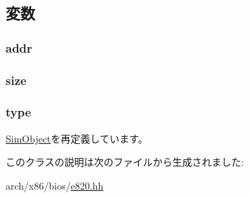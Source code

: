 \subsection{変数}
\hypertarget{classX86ISA_1_1E820Entry_a0bb77b4ba61e408313e1118250f9278c}{
\subsubsection[{addr}]{ {\bf addr}}}
\label{classX86ISA_1_1E820Entry_a0bb77b4ba61e408313e1118250f9278c}
\hypertarget{classX86ISA_1_1E820Entry_a8ce507144b5ef53350af753eafb669f0}{
\subsubsection[{size}]{ {\bf size}}}
\label{classX86ISA_1_1E820Entry_a8ce507144b5ef53350af753eafb669f0}
\hypertarget{classX86ISA_1_1E820Entry_ad44b615021ed3ccb734fcaf583ef4a03}{
\subsubsection[{type}]{ {\bf type}}}
\label{classX86ISA_1_1E820Entry_ad44b615021ed3ccb734fcaf583ef4a03}


\hyperlink{classm5_1_1SimObject_1_1SimObject_acce15679d830831b0bbe8ebc2a60b2ca}{SimObject}を再定義しています。

このクラスの説明は次のファイルから生成されました:\begin{DoxyCompactItemize}
\item 
arch/x86/bios/\hyperlink{e820_8hh}{e820.hh}\end{DoxyCompactItemize}
